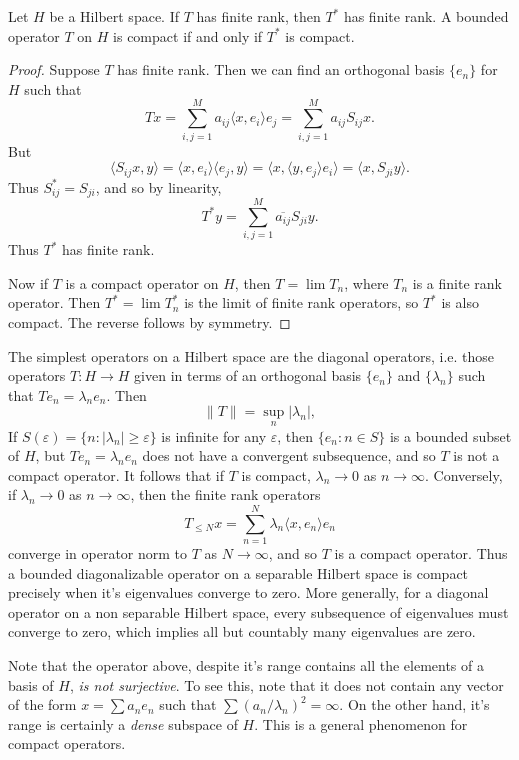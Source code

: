 \begin{corollary}
    Let $H$ be a Hilbert space. If $T$ has finite rank, then $T^*$ has finite rank. A bounded operator $T$ on $H$ is compact if and only if $T^*$ is compact.
\end{corollary}
\begin{proof}
    Suppose $T$ has finite rank. Then we can find an orthogonal basis $\{ e_n \}$ for $H$ such that
    \[ Tx = \sum_{i,j = 1}^M a_{ij} \langle x, e_i \rangle e_j = \sum_{i,j = 1}^M a_{ij} S_{ij} x. \]
    But
    \[ \langle S_{ij} x, y \rangle = \langle x, e_i \rangle \langle e_j, y \rangle = \langle x, \langle y, e_j \rangle e_i \rangle = \langle x, S_{ji} y \rangle. \]
    Thus $S_{ij}^* = S_{ji}$, and so by linearity,
    \[ T^* y = \sum_{i,j = 1}^M \overline{a_{ij}} S_{ji} y. \]
    Thus $T^*$ has finite rank.

    Now if $T$ is a compact operator on $H$, then $T = \lim T_n$, where $T_n$ is a finite rank operator. Then $T^* = \lim T_n^*$ is the limit of finite rank operators, so $T^*$ is also compact. The reverse follows by symmetry.
\end{proof}

\begin{example}
    The simplest operators on a Hilbert space are the diagonal operators, i.e. those operators $T: H \to H$ given in terms of an orthogonal basis $\{ e_n \}$ and $\{ \lambda_n \}$ such that $Te_n = \lambda_n e_n$. Then
    \[ \| T \| = \sup_n |\lambda_n|, \]
    If $S(\varepsilon) = \{ n : |\lambda_n| \geq \varepsilon \}$ is infinite for any $\varepsilon$, then $\{ e_n : n \in S \}$ is a bounded subset of $H$, but $Te_n = \lambda_n e_n$ does not have a convergent subsequence, and so $T$ is not a compact operator. It follows that if $T$ is compact, $\lambda_n \to 0$ as $n \to \infty$. Conversely, if $\lambda_n \to 0$ as $n \to \infty$, then the finite rank operators
    \[ T_{\leq N} x = \sum_{n = 1}^N \lambda_n \langle x, e_n \rangle e_n \]
    converge in operator norm to $T$ as $N \to \infty$, and so $T$ is a compact operator. Thus a bounded diagonalizable operator on a separable Hilbert space is compact precisely when it's eigenvalues converge to zero. More generally, for a diagonal operator on a non separable Hilbert space, every subsequence of eigenvalues must converge to zero, which implies all but countably many eigenvalues are zero.
\end{example}

Note that the operator above, despite it's range contains all the elements of a basis of $H$, \emph{is not surjective}. To see this, note that it does not contain any vector of the form $x = \sum a_n e_n$ such that $\sum (a_n / \lambda_n)^2 = \infty$. On the other hand, it's range is certainly a \emph{dense} subspace of $H$. This is a general phenomenon for compact operators.


